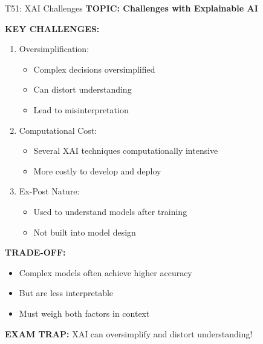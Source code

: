 \documentclass[8pt]{beamer}
\begin{document}
	\begin{frame}{T51: XAI Challenges}
		\fontsize{6.5}{7.5}\selectfont
		\textbf{TOPIC: Challenges with Explainable AI}
		
		\vspace{0.1cm}
		\textbf{KEY CHALLENGES:}
		\begin{enumerate}
			\item \textcolor{myblue}{Oversimplification:}
			\begin{itemize}
				\item Complex decisions oversimplified
				\item Can distort understanding
				\item Lead to misinterpretation
			\end{itemize}
			\item \textcolor{myblue}{Computational Cost:}
			\begin{itemize}
				\item Several XAI techniques computationally intensive
				\item More costly to develop and deploy
			\end{itemize}
			\item \textcolor{myblue}{Ex-Post Nature:}
			\begin{itemize}
				\item Used to understand models after training
				\item Not built into model design
			\end{itemize}
		\end{enumerate}
		
		\vspace{0.1cm}
		\textbf{TRADE-OFF:}
		\begin{itemize}
			\item Complex models often achieve higher accuracy
			\item But are less interpretable
			\item Must weigh both factors in context
		\end{itemize}
		
		\textcolor{myred}{\textbf{EXAM TRAP:}} XAI can \textcolor{myblue}{oversimplify and distort understanding}!
	\end{frame}
	
\end{document}
